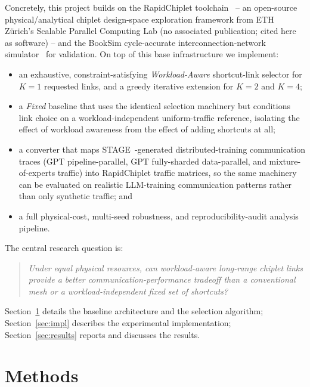 \documentclass[conference]{IEEEtran}
\begin{document}
Concretely, this project builds on the RapidChiplet toolchain~\cite{rapidchiplet} -- an open-source physical/analytical chiplet design-space exploration framework from ETH Z\"urich's Scalable Parallel Computing Lab (no associated publication; cited here as software) -- and the BookSim cycle-accurate interconnection-network simulator~\cite{booksim} for validation. On top of this base infrastructure we implement:
\begin{itemize}
\item an exhaustive, constraint-satisfying \emph{Workload-Aware} shortcut-link selector for $K{=}1$ requested links, and a greedy iterative extension for $K{=}2$ and $K{=}4$;
\item a \emph{Fixed} baseline that uses the identical selection machinery but conditions link choice on a workload-independent uniform-traffic reference, isolating the effect of workload awareness from the effect of adding shortcuts at all;
\item a converter that maps STAGE~\cite{stage}-generated distributed-training communication traces (GPT pipeline-parallel, GPT fully-sharded data-parallel, and mixture-of-experts traffic) into RapidChiplet traffic matrices, so the same machinery can be evaluated on realistic LLM-training communication patterns rather than only synthetic traffic; and
\item a full physical-cost, multi-seed robustness, and reproducibility-audit analysis pipeline.
\end{itemize}

The central research question is:
\begin{quote}
\emph{Under equal physical resources, can workload-aware long-range chiplet links provide a better communication-performance tradeoff than a conventional mesh or a workload-independent fixed set of shortcuts?}
\end{quote}
Section~\ref{sec:methods} details the baseline architecture and the selection algorithm; Section~\ref{sec:impl} describes the experimental implementation; Section~\ref{sec:results} reports and discusses the results.

\section{Methods}
\label{sec:methods}
\end{document}
